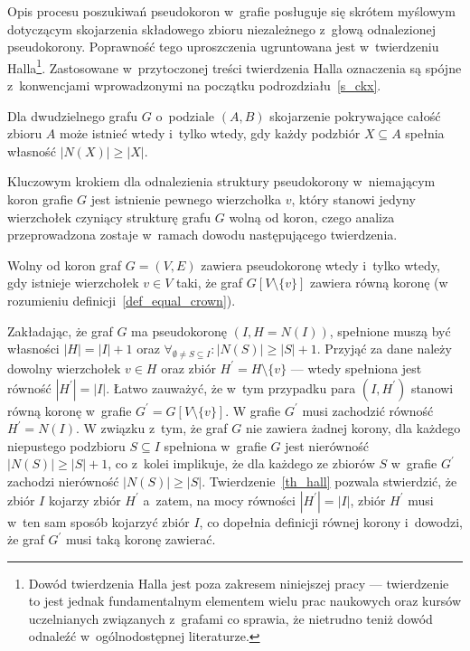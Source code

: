\par{
  Opis procesu poszukiwań pseudokoron w~grafie posługuje się skrótem myślowym dotyczącym skojarzenia składowego zbioru niezależnego z~głową odnalezionej pseudokorony. 
  Poprawność tego uproszczenia ugruntowana jest w~twierdzeniu Halla\footnote{Dowód twierdzenia Halla jest poza zakresem niniejszej pracy --- twierdzenie to jest jednak fundamentalnym elementem wielu prac naukowych oraz kursów uczelnianych związanych z~grafami co sprawia, że nietrudno teniż dowód odnaleźć w~ogólnodostępnej literaturze.}.
  Zastosowane w~przytoczonej treści twierdzenia Halla oznaczenia są spójne z~konwencjami wprowadzonymi na początku podrozdziału~\ref{s_ckx}.
  \begin{theorem}
    Dla dwudzielnego grafu $G$ o~podziale $(A, B)$ skojarzenie pokrywające całość zbioru $A$ może istnieć wtedy i~tylko wtedy, gdy każdy podzbiór $X \subseteq A$ spełnia własność $|N(X)| \geq |X|$.
  \end{theorem}
  Kluczowym krokiem dla odnalezienia struktury pseudokorony w~niemającym koron grafie $G$ jest istnienie pewnego wierzchołka $v$, który stanowi jedyny wierzchołek czyniący strukturę grafu $G$ wolną od koron, czego analiza przeprowadzona zostaje w~ramach dowodu następującego twierdzenia.
  \begin{theorem}
    Wolny od koron graf $G=(V, E)$ zawiera pseudokoronę wtedy i~tylko wtedy, gdy istnieje wierzchołek $v \in V$ taki, że graf $G[V\setminus \{v\}]$ zawiera równą koronę (w rozumieniu definicji~\ref{def_equal_crown}).
  \end{theorem}
  \begin{bproof}
    Zakładając, że graf $G$ ma pseudokoronę $(I, H=N(I))$, spełnione muszą być własności $|H| = |I| + 1$ oraz $\forall_{\emptyset\neq S \subseteq I}:{|N(S)|\geq|S|+1}$.
    Przyjąć za dane należy dowolny wierzchołek $v \in H$ oraz zbiór $H^\prime=H \setminus \{v\}$ --- wtedy spełniona jest równość $|H^\prime|=|I|$.
    Łatwo zauważyć, że w~tym przypadku para $(I, H^\prime)$ stanowi równą koronę w~grafie $G^\prime = G[V \setminus \{v\}]$.
    W grafie $G^\prime$ musi zachodzić równość $H^\prime = N(I)$.
    W związku z~tym, że graf $G$ nie zawiera żadnej korony, dla każdego niepustego podzbioru $S \subseteq I$ spełniona w~grafie $G$ jest nierówność $|N(S)| \geq |S|+1$, co z~kolei implikuje, że dla każdego ze zbiorów $S$ w~grafie $G^\prime$ zachodzi nierówność $|N(S)| \geq |S|$.
    Twierdzenie~\ref{th_hall} pozwala stwierdzić, że zbiór $I$ kojarzy zbiór $H^\prime$ a~zatem, na mocy równości $|H^\prime|=|I|$, zbiór $H^\prime$ musi w~ten sam sposób kojarzyć zbiór $I$, co dopełnia definicji równej korony i~dowodzi, że graf $G^\prime$ musi taką koronę zawierać.


\end{bproof}}
